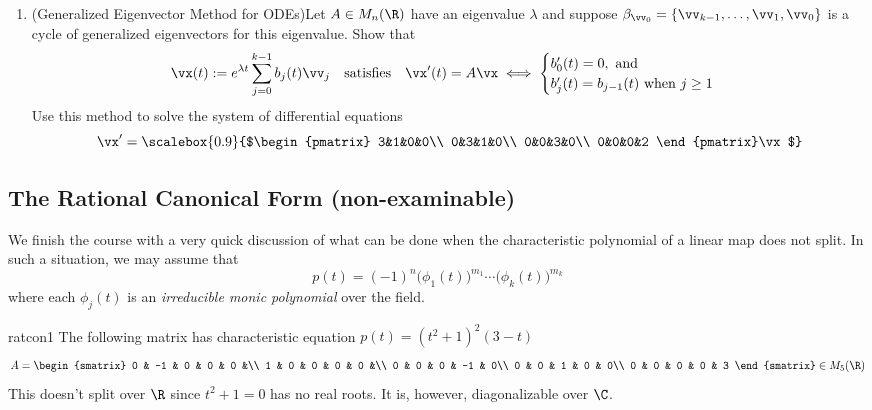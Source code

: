 \begin{exercises}
\begin{enumerate}
\begin{enumerate}
	  \item $\rT(f)=af_x+bf_y$ on $\Span_\R\{1,x,y,x^2,y^2,xy\}$. How does your answer depend on $a,b$?
	\end{enumerate}
	
	\item (Generalized Eigenvector Method for ODEs)\quad Let $A\in M_n(\R)$ have an eigenvalue $\lambda$ and suppose $\beta_{\vv_0}=\{\vv_{k-1},\ldots,\vv_1,\vv_0\}$ is a cycle of generalized eigenvectors for this eigenvalue. Show that
	\[\vx(t):=e^{\lambda t}\sum_{j=0}^{k-1}b_j(t)\vv_j\quad\text{satisfies}\quad\vx'(t)=A\vx\iff \begin{cases}
	b_0'(t)=0,\text{ and}\\
	b'_j(t)=b_{j-1}(t)\text{ when $j\ge 1$}
	\end{cases}\]
	Use this method to solve the system of differential equations
	\[\vx'=\scalebox{0.9}{$\begin{pmatrix}
	3&1&0&0\\
	0&3&1&0\\
	0&0&3&0\\
	0&0&0&2
	\end{pmatrix}\vx$}\]
\end{enumerate}
\end{exercises}

 
\subsection{The Rational Canonical Form (non-examinable)}

We finish the course with a very quick discussion of what can be done when the characteristic polynomial of a linear map does not split. In such a situation, we may assume that
\[p(t)=(-1)^n\bigl(\phi_1(t)\bigr)^{m_1}\cdots\bigl(\phi_k(t)\bigr)^{m_k}\tag{$\ast$}\]
where each $\phi_j(t)$ is an \emph{irreducible monic polynomial} over the field.

\begin{example}{}{ratcon1}
The following matrix has characteristic equation $p(t)=(t^2+1)^2(3-t)$
\[A=\begin{smatrix}
0 & -1 & 0 & 0 & 0 &\\
1 & 0 & 0 & 0 & 0 &\\
0 & 0 & 0 & -1 & 0\\
0 & 0 & 1 & 0 & 0\\
0 & 0 & 0 & 0 & 3 
\end{smatrix}\in M_5(\R)\]
This doesn't split over $\R$ since $t^2+1=0$ has no real roots. It is, however, diagonalizable over $\C$.
\end{example}

